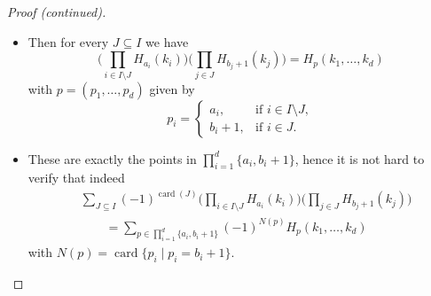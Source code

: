 \documentclass[
    t,10pt,
    handout
]{beamer}
\let\qedhere\relax
\newif\ifqedplaced
\newcommand{\qedhere}{\hfill$\square$\global\qedplacedtrue}
\DeclareMathOperator{\card}{card}
\begin{document}
\begin{frame}
    \begin{proof}[Proof (continued)]
        \begin{itemize}
            \item Then for every \( J \subseteq I \) we have 
                \begin{equation*}
                    \Bigg( \prod_{i \in I \setminus J} H_{a_i}(k_i) \Bigg) \Bigg( \prod_{j \in J} H_{b_j+1}(k_j) \Bigg) = H_p(k_1,\dots,k_d)
                \end{equation*}
                with \( p = (p_1,\dots,p_d) \) given by 
                \begin{equation*}
                    p_i = \begin{cases}
                        a_i, &\text{if } i \in I \setminus J, \\
                        b_i+1, &\text{if } i \in J. 
                    \end{cases}
                \end{equation*}
            \item These are exactly the points in \( \prod_{i=1}^d \{ a_i, b_i+1\} \), hence it is not hard to verify that indeed 
                \begin{align*}
                    &\sum_{J \subseteq I} (-1)^{\card(J)} \Bigg( \prod_{i \in I \setminus J} H_{a_i}(k_i) \Bigg) \Bigg( \prod_{j \in J} H_{b_j+1}(k_j) \Bigg) \\
                    &\qquad= \sum_{p \in \prod_{i=1}^d \{a_i,b_i+1\}} (-1)^{N(p)} H_p(k_1,\dots,k_d)
                \end{align*}
                with \( N(p) = \card\{ p_i \mid p_i = b_i+1 \} \). \qedhere 
        \end{itemize}
    \end{proof}
\end{frame}
\end{document}
